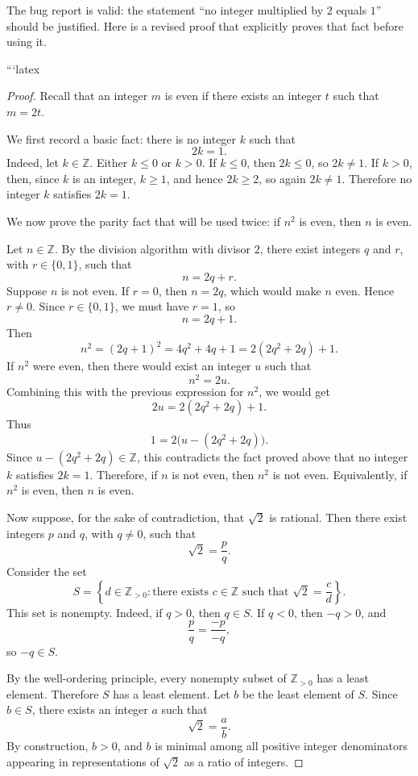 The bug report is valid: the statement “no integer multiplied by \(2\) equals \(1\)” should be justified. Here is a revised proof that explicitly proves that fact before using it.

```latex
\begin{proof}
Recall that an integer \(m\) is even if there exists an integer \(t\) such that
\(m=2t\).

We first record a basic fact: there is no integer \(k\) such that
\[
2k=1.
\]
Indeed, let \(k\in\mathbb{Z}\). Either \(k\leq 0\) or \(k>0\). If \(k\leq 0\),
then \(2k\leq 0\), so \(2k\neq 1\). If \(k>0\), then, since \(k\) is an
integer, \(k\geq 1\), and hence \(2k\geq 2\), so again \(2k\neq 1\). Therefore
no integer \(k\) satisfies \(2k=1\).

We now prove the parity fact that will be used twice: if \(n^2\) is even, then
\(n\) is even.

Let \(n\in\mathbb{Z}\). By the division algorithm with divisor \(2\), there
exist integers \(q\) and \(r\), with \(r\in\{0,1\}\), such that
\[
n=2q+r.
\]
Suppose \(n\) is not even. If \(r=0\), then \(n=2q\), which would make \(n\)
even. Hence \(r\neq 0\). Since \(r\in\{0,1\}\), we must have \(r=1\), so
\[
n=2q+1.
\]
Then
\[
n^2=(2q+1)^2=4q^2+4q+1=2(2q^2+2q)+1.
\]
If \(n^2\) were even, then there would exist an integer \(u\) such that
\[
n^2=2u.
\]
Combining this with the previous expression for \(n^2\), we would get
\[
2u=2(2q^2+2q)+1.
\]
Thus
\[
1=2\bigl(u-(2q^2+2q)\bigr).
\]
Since \(u-(2q^2+2q)\in\mathbb{Z}\), this contradicts the fact proved above that
no integer \(k\) satisfies \(2k=1\). Therefore, if \(n\) is not even, then
\(n^2\) is not even. Equivalently, if \(n^2\) is even, then \(n\) is even.

Now suppose, for the sake of contradiction, that \(\sqrt{2}\) is rational. Then
there exist integers \(p\) and \(q\), with \(q\neq 0\), such that
\[
\sqrt{2}=\frac{p}{q}.
\]
Consider the set
\[
S=\left\{ d\in \mathbb{Z}_{>0} : \text{there exists } c\in\mathbb{Z}
\text{ such that } \sqrt{2}=\frac{c}{d} \right\}.
\]
This set is nonempty. Indeed, if \(q>0\), then \(q\in S\). If \(q<0\), then
\(-q>0\), and
\[
\frac{p}{q}=\frac{-p}{-q},
\]
so \(-q\in S\).

By the well-ordering principle, every nonempty subset of \(\mathbb{Z}_{>0}\)
has a least element. Therefore \(S\) has a least element. Let \(b\) be the least
element of \(S\). Since \(b\in S\), there exists an integer \(a\) such that
\[
\sqrt{2}=\frac{a}{b}.
\]
By construction, \(b>0\), and \(b\) is minimal among all positive integer
denominators appearing in representations of \(\sqrt{2}\) as a ratio of
integers.


\end{proof}
